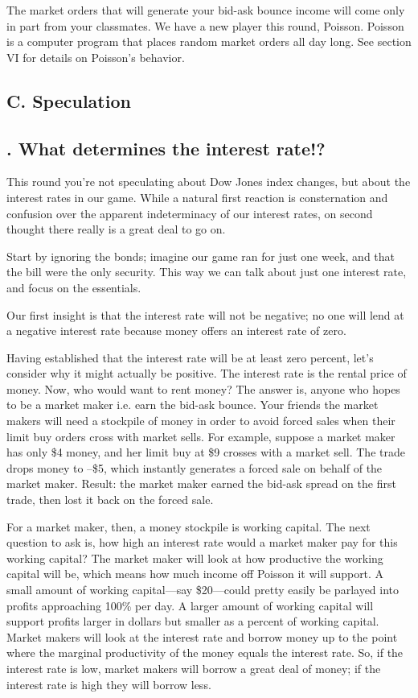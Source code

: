 The market orders that will generate your bid-ask bounce income will
come only in part from your classmates.  We have a new player this
round, Poisson.  Poisson is a computer program that places random
market orders all day long.  See section VI for details on Poisson's
behavior.

\subsection{C. Speculation}%

\subsection{. What determines the interest rate!?}%
This round you're not speculating about Dow Jones index changes, but
about the interest rates in our game.  While a natural first reaction
is consternation and confusion over the apparent indeterminacy of our
interest rates, on second thought there really is a great deal to go
on.

Start by ignoring the bonds; imagine our game ran for just one week,
and that the bill were the only security.  This way we can talk about
just one interest rate, and focus on the essentials.

Our first insight is that the interest rate will not be negative; no
one will lend at a negative interest rate because money offers an
interest rate of zero.

Having established that the interest rate will be at least zero
percent, let's consider why it might actually be positive.  The
interest rate is the rental price of money.  Now, who would want to
rent money?  The answer is, anyone who hopes to be a market maker
i.e. earn the bid-ask bounce.  Your friends the market makers will
need a stockpile of money in order to avoid forced sales when their
limit buy orders cross with market sells.  For example, suppose a
market maker has only \$4 money, and her limit buy at \$9 crosses with
a market sell.  The trade drops money to --\$5, which instantly
generates a forced sale on behalf of the market maker.  Result: the
market maker earned the bid-ask spread on the first trade, then lost
it back on the forced sale.%

For a market maker, then, a money stockpile is working capital.  The next
question to ask is, how high an interest rate would a market maker pay
for this working capital?  The market maker will look at how productive
the working capital will be, which means how much income off Poisson
it will support.  A small amount of working capital---say \$20---could
pretty easily be parlayed into profits approaching 100\% per day.
A larger amount of working capital will support profits larger in dollars
but smaller as a percent of working capital.  Market makers will look
at the interest rate and borrow money up to the point where the marginal
productivity of the money equals the interest rate.  So, if the interest
rate is low, market makers will borrow a great deal of money; if the
interest rate is high they will borrow less.

